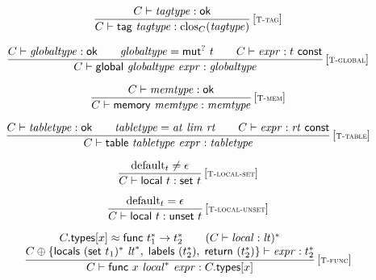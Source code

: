 $$
\begin{array}{@{}c@{}}\displaystyle
\frac{
C \vdash {\mathit{tagtype}} : \mathsf{ok}
}{
C \vdash \mathsf{tag}~{\mathit{tagtype}} : {{\mathrm{clos}}}_{C}({\mathit{tagtype}})
} \, {[\textsc{\scriptsize T{-}tag}]}
\qquad
\end{array}
$$

$$
\begin{array}{@{}c@{}}\displaystyle
\frac{
C \vdash {\mathit{globaltype}} : \mathsf{ok}
 \qquad
{\mathit{globaltype}} = {\mathsf{mut}^?}~t
 \qquad
C \vdash {\mathit{expr}} : t~\mathsf{const}
}{
C \vdash \mathsf{global}~{\mathit{globaltype}}~{\mathit{expr}} : {\mathit{globaltype}}
} \, {[\textsc{\scriptsize T{-}global}]}
\qquad
\end{array}
$$

$$
\begin{array}{@{}c@{}}\displaystyle
\frac{
C \vdash {\mathit{memtype}} : \mathsf{ok}
}{
C \vdash \mathsf{memory}~{\mathit{memtype}} : {\mathit{memtype}}
} \, {[\textsc{\scriptsize T{-}mem}]}
\qquad
\end{array}
$$

$$
\begin{array}{@{}c@{}}\displaystyle
\frac{
C \vdash {\mathit{tabletype}} : \mathsf{ok}
 \qquad
{\mathit{tabletype}} = {\mathit{at}}~{\mathit{lim}}~{\mathit{rt}}
 \qquad
C \vdash {\mathit{expr}} : {\mathit{rt}}~\mathsf{const}
}{
C \vdash \mathsf{table}~{\mathit{tabletype}}~{\mathit{expr}} : {\mathit{tabletype}}
} \, {[\textsc{\scriptsize T{-}table}]}
\qquad
\end{array}
$$

$$
\begin{array}{@{}c@{}}\displaystyle
\frac{
{{\mathrm{default}}}_{t} \neq \epsilon
}{
C \vdash \mathsf{local}~t : \mathsf{set}~t
} \, {[\textsc{\scriptsize T{-}local{-}set}]}
\qquad
\end{array}
$$

$$
\begin{array}{@{}c@{}}\displaystyle
\frac{
{{\mathrm{default}}}_{t} = \epsilon
}{
C \vdash \mathsf{local}~t : \mathsf{unset}~t
} \, {[\textsc{\scriptsize T{-}local{-}unset}]}
\qquad
\end{array}
$$

$$
\begin{array}{@{}c@{}}\displaystyle
\frac{
\begin{array}{@{}c@{}}
C{.}\mathsf{types}{}[x] \approx \mathsf{func}~{t_1^\ast} \rightarrow {t_2^\ast}
 \qquad
(C \vdash {\mathit{local}} : {{\mathit{lt}}})^\ast
 \\
C \oplus \{ \mathsf{locals}~{(\mathsf{set}~t_1)^\ast}~{{{\mathit{lt}}}^\ast},\;\allowbreak \mathsf{labels}~({t_2^\ast}),\;\allowbreak \mathsf{return}~({t_2^\ast}) \} \vdash {\mathit{expr}} : {t_2^\ast}
\end{array}
}{
C \vdash \mathsf{func}~x~{{\mathit{local}}^\ast}~{\mathit{expr}} : C{.}\mathsf{types}{}[x]
} \, {[\textsc{\scriptsize T{-}func}]}
\qquad
\end{array}
$$

